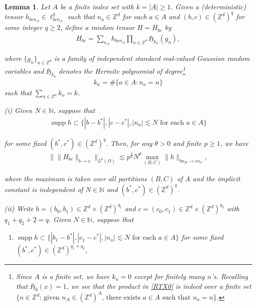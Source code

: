 \documentclass[%
11pt,  reqno]{amsart}
\newtheorem{lemma}[theorem]{Lemma}
\DeclareMathOperator*{\supp}{supp}
\newcommand{\1}{\hspace{0.2mm}\text{I}\hspace{0.2mm}}
\newcommand{\noi}{\noindent}
\newcommand{\Z}{\mathbb{Z}}
\renewcommand{\l}{\ell}
\renewcommand{\O}{\Omega}
\newcommand{\les}{\lesssim}
\newcommand{\N}{\mathbb{N}}
\numberwithin{equation}{section}
\numberwithin{theorem}{section}
\newcommand{\Hf}{\mathfrak{H}}
\begin{document}
\begin{lemma}\label{LEM:RT}
Let $A$ be a finite index set with $k = |A| \ge 1$.
Given a \textup{(}deterministic\textup{)} tensor
 $h_{bcn_A} \in \l^2_{bcn_A}$
 such that $n_a \in \Z^d$ for each $a \in A$ and $(b,c) \in (\Z^d)^q$ for some integer $q \geq 2$, define 
a random tensor $H = H_{bc}$ by
\begin{align}
H_{bc} =  \sum_{n_A} h_{bcn_A} 
\prod_{n \in \Z^d} 
\Hf_{k_n}(g_{n}), 
\label{RTX0}
\end{align}

\noi
where $\{g_n\}_{n \in \Z^d}$ is a family of independent
standard real-valued Gaussian random variables
and 
$\Hf_{k_a}$ denotes the Hermite polynomial of degree\footnote{Since $A$ is 
a finite set, we have $k_n = 0$ except for finitely many $n$'s.
Recalling that $\Hf_0(x) = 1$, we see that the product in \eqref{RTX0}
is indeed over a finite set $\{n \in \Z^d:\,\text{given $n_A \in (\Z^d)^A$, there exists } a \in A \text{ such that }n_a = n \}$.}
\begin{align}
k_n = \#\{ a\in A: n_a = n\}
\label{RTX0a}
\end{align}
such that $\sum_{n \in \Z^d} k_n = k$.

\medskip


\noi
\textup{(i)}
Given $N \in \N$, suppose that 
\begin{align*}
\supp h \subset \big\{ |b - b^*|, |c - c^*|, |n_a| \les N
\text{ for each $a \in A$}
 \big\}
\end{align*} 

\noi
for some fixed $(b^*, c^*) \in (\Z^d)^q$.
Then, 
 for any $\theta > 0$ and finite $p \ge 1$, we have
\begin{align*}
\big\| \| H_{bc} \|_{b \to c} \big\|_{L^p(\O)} 
\les p^{\frac k2} N^{\theta}  \max_{(B,C)} \| h \|_{b n_B \to c n_C}, 
\end{align*}

\noi
where the maximum is taken over  all partitions $(B,C)$ of $A$
and the implicit constant is independent of $N \in \N$
and $(b^*, c^*) \in (\Z^d)^q$.


\medskip


\noi
\textup{(ii)}
Write $b = (b_0, b_1) \in \Z^d \times (\Z^d)^{q_1}$
and
$c = (c_0, c_1) \in \Z^d \times (\Z^d)^{q_2}$
with $q_1 + q_2 + 2 = q$.
Given $N \in \N$, suppose that 


\smallskip
\begin{enumerate}
\item[(ii.a)]
$\supp h \subset \big\{ |b_1 - b^*|, |c_1 - c^*|, |n_a| \les N
\text{ for each $a \in A$}\big\}$
for some fixed $(b^*, c^*) \in (\Z^d)^{q_1 + q_2}$, 




\end{enumerate}
\end{lemma}
\end{document}
